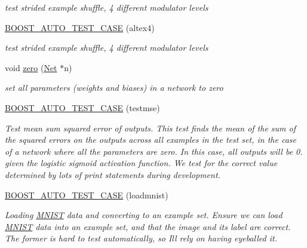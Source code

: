 \begin{DoxyCompactItemize}
\begin{DoxyCompactList}\small\item\em test strided example shuffle, 4 different modulator levels \end{DoxyCompactList}\item 
\hyperlink{group__basictests_gaef74c48a74c8dde77a98b18c1e0cd9b3}{B\+O\+O\+S\+T\+\_\+\+A\+U\+T\+O\+\_\+\+T\+E\+S\+T\+\_\+\+C\+A\+SE} (altex4)
\begin{DoxyCompactList}\small\item\em test strided example shuffle, 4 different modulator levels \end{DoxyCompactList}\item 
void \hyperlink{group__basictests_ga74ab1bd4f33a7d4671010710c83baa74}{zero} (\hyperlink{classNet}{Net} $\ast$n)
\begin{DoxyCompactList}\small\item\em set all parameters (weights and biases) in a network to zero \end{DoxyCompactList}\item 
\hyperlink{group__basictests_ga24b757533cad8c65d523f3d3f552c8a6}{B\+O\+O\+S\+T\+\_\+\+A\+U\+T\+O\+\_\+\+T\+E\+S\+T\+\_\+\+C\+A\+SE} (testmse)
\begin{DoxyCompactList}\small\item\em Test mean sum squared error of outputs. This test finds the mean of the sum of the squared errors on the outputs across all examples in the test set, in the case of a network where all the parameters are zero. In this case, all outputs will be 0. given the logistic sigmoid activation function. We test for the correct value determined by lots of print statements during development. \end{DoxyCompactList}\item 
\hyperlink{group__basictests_ga90ac9b7ee58da02fed518568d5fb8bc2}{B\+O\+O\+S\+T\+\_\+\+A\+U\+T\+O\+\_\+\+T\+E\+S\+T\+\_\+\+C\+A\+SE} (loadmnist)
\begin{DoxyCompactList}\small\item\em Loading \hyperlink{classMNIST}{M\+N\+I\+ST} data and converting to an example set. Ensure we can load \hyperlink{classMNIST}{M\+N\+I\+ST} data into an example set, and that the image and its label are correct. The former is hard to test automatically, so I\textquotesingle{}ll rely on having eyeballed it. \end{DoxyCompactList}\end{DoxyCompactItemize}


